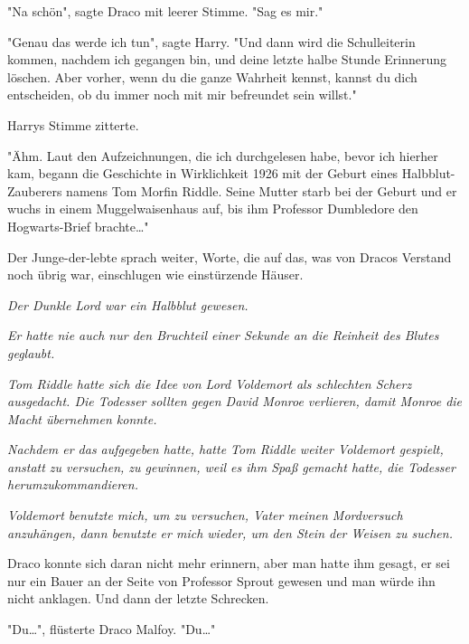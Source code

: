{"Na schön", sagte Draco mit leerer Stimme. "Sag es mir."

"Genau das werde ich tun", sagte Harry. "Und dann wird die Schulleiterin kommen, nachdem ich gegangen bin, und deine letzte halbe Stunde Erinnerung löschen. Aber vorher, wenn du die ganze Wahrheit kennst, kannst du dich entscheiden, ob du immer noch mit mir befreundet sein willst."

Harrys Stimme zitterte.

"Ähm. Laut den Aufzeichnungen, die ich durchgelesen habe, bevor ich hierher kam, begann die Geschichte in Wirklichkeit 1926 mit der Geburt eines Halbblut-Zauberers namens Tom Morfin Riddle. Seine Mutter starb bei der Geburt und er wuchs in einem Muggelwaisenhaus auf, bis ihm Professor Dumbledore den Hogwarts-Brief brachte…"

Der Junge-der-lebte sprach weiter, Worte, die auf das, was von Dracos Verstand noch übrig war, einschlugen wie einstürzende Häuser.

\emph{Der Dunkle Lord war ein Halbblut gewesen.}

\emph{Er hatte nie auch nur den Bruchteil einer Sekunde an die Reinheit des Blutes geglaubt.}

\emph{Tom Riddle hatte sich die Idee von Lord Voldemort als schlechten Scherz ausgedacht. Die Todesser sollten gegen David Monroe verlieren, damit Monroe die Macht übernehmen konnte.}

\emph{Nachdem er das aufgegeben hatte, hatte Tom Riddle weiter Voldemort gespielt, anstatt zu versuchen, zu gewinnen, weil es ihm Spaß gemacht hatte, die Todesser herumzukommandieren.}

\emph{Voldemort benutzte mich, um zu versuchen, Vater meinen Mordversuch anzuhängen, dann benutzte er mich wieder, um den Stein der Weisen zu suchen.}

Draco konnte sich daran nicht mehr erinnern, aber man hatte ihm gesagt, er sei nur ein Bauer an der Seite von Professor Sprout gewesen und man würde ihn nicht anklagen. Und dann der letzte Schrecken.

"Du…", flüsterte Draco Malfoy. "Du…"

}
